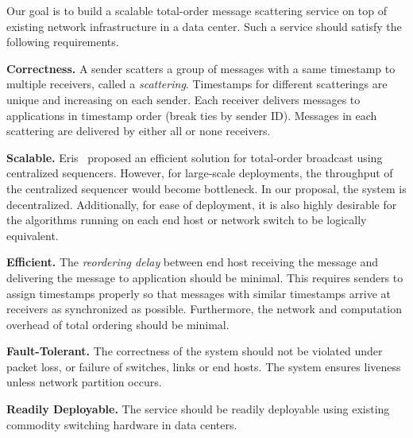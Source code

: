 Our goal is to build a scalable total-order message scattering service on top of existing network infrastructure in a data center.
Such a service should satisfy the following requirements.

\textbf{Correctness.}
A sender scatters a group of messages with a same timestamp to multiple receivers, called a \textit{scattering}.
Timestamps for different scatterings are unique and increasing on each sender.
Each receiver delivers messages to applications in timestamp order (break ties by sender ID).
Messages in each scattering are delivered by either all or none receivers.

\textbf{Scalable.}
Eris~\cite{eris} proposed an efficient solution for total-order broadcast using centralized sequencers.
However, for large-scale deployments, the throughput of the centralized sequencer would become bottleneck.
In our proposal, the system is decentralized.
Additionally, for ease of deployment, it is also highly desirable for the algorithms running on each end host or network switch to be logically equivalent.

\textbf{Efficient.}
The \textit{reordering delay} between end host receiving the message and delivering the message to application should be minimal.
This requires senders to assign timestamps properly so that messages with similar timestamps arrive at receivers as synchronized as possible.
Furthermore, the network and computation overhead of total ordering should be minimal.




\textbf{Fault-Tolerant.}
The correctness of the system should not be violated under packet loss, or failure of switches, links or end hosts.
The system ensures liveness unless network partition occurs.


\textbf{Readily Deployable.}
The service should be readily deployable using existing commodity switching hardware in data centers.


